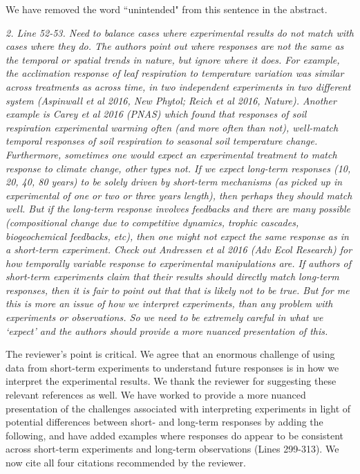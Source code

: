 \documentclass[11pt,a4paper]{letter}
\begin{document}
We have removed the word ``unintended"  from this sentence in the abstract.

\emph{2. Line 52-53. Need to balance cases where experimental results do not match with cases where they do. The authors point out where responses are not the same as the temporal or spatial trends in nature, but ignore where it does. For example, the acclimation response of leaf respiration to temperature variation was similar across treatments as across time, in two independent experiments in two different system (Aspinwall et al 2016, New Phytol; Reich et al 2016, Nature). Another example is Carey et al 2016 (PNAS) which found that responses of soil respiration experimental warming often (and more often than not), well-match temporal responses of soil respiration to seasonal soil temperature change. Furthermore, sometimes one would expect an experimental treatment to match response to climate change, other types not. If we expect long-term responses (10, 20, 40, 80 years) to be solely driven by short-term mechanisms (as picked up in experimental of one or two or three years length), then perhaps they should match well. But if the long-term response involves feedbacks and there are many possible (compositional change due to competitive dynamics, trophic cascades, biogeochemical feedbacks, etc), then one might not expect the same response as in a short-term experiment. Check out Andressen et al 2016 (Adv Ecol Research) for how temporally variable response to experimental manipulations are. If authors of short-term
experiments claim that their results should directly match long-term responses, then it is fair to point out that that is likely not to be true. But for me this is more an issue of how we interpret experiments, than any problem with experiments or observations. So we need to be extremely careful in what we `expect' and the authors should provide a more nuanced presentation of this.}

The reviewer's point is critical. We agree that an enormous challenge of using data from short-term experiments to understand future responses is in how we interpret the experimental results. We thank the reviewer for suggesting these relevant references as well. We have worked to provide a more nuanced presentation of the challenges associated with interpreting experiments in light of potential differences between short- and long-term responses by adding the following, and have added examples where responses do appear to be consistent across short-term experiments and long-term observations (Lines 299-313). We now cite all four citations recommended by the reviewer. 
\end{document}
